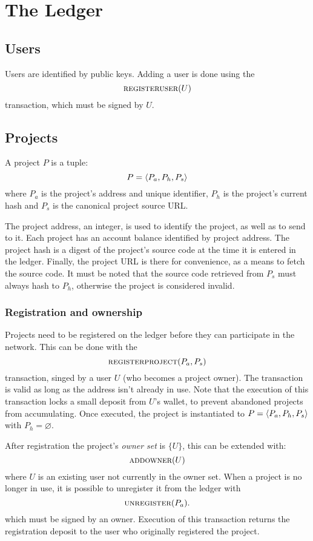 \section{The \oscoin{} Ledger}

\subsection{Users}

Users are identified by public keys. Adding a user is done using the
\[
    \text{\normalfont\scshape registeruser}\small{\lparen U\rparen}
\]
transaction, which must be signed by $U$.

\subsection{Projects}
\label{s:projects}

A project $P$ is a tuple:
\[
    P = \langle P_a, P_h, P_s\rangle
\]
where $P_{a}$ is the project's address and unique identifier, $P_h$ is
the project's current hash and $P_s$ is the canonical project source
URL.

The project address, an integer, is used to identify the project, as
well as to send \oscoin{} to it. Each project has an account balance
identified by project address. The project hash is a digest of the
project's source code at the time it is entered in the
ledger. Finally, the project URL is there for convenience, as a means
to fetch the source code.  It must be noted that the source code
retrieved from $P_s$ must always hash to $P_h$, otherwise the project
is considered invalid.

\subsubsection{Registration and ownership} Projects need to be
registered on the ledger before they can participate in the
network. This can be done with the
\[
    \text{\normalfont\scshape registerproject}\small{\lparen P_a, P_s\rparen}
\]
transaction, singed by a user $U$ (who becomes a project owner). The
transaction is valid as long as the address isn't already in use. Note
that the execution of this transaction locks a small \oscoin{} deposit
from $U$'s wallet, to prevent abandoned projects from
accumulating. Once executed, the project is instantiated to
$P = \langle P_a, P_h, P_s\rangle$ with $P_h = \varnothing$.

After registration the project's \emph{owner set} is $\{U\}$, this can
be extended with:
\[
    \text{\normalfont\scshape addowner}\small{\lparen U\rparen}
\]
where $U$ is an existing user not currently in the owner set.
When a project is no longer in use, it is possible to unregister it from the
ledger with
\[
    \text{\normalfont\scshape unregister}\small{\lparen P_a\rparen}.
\]
which must be signed by an owner. Execution of this transaction
returns the registration deposit to the user who originally registered
the project.

